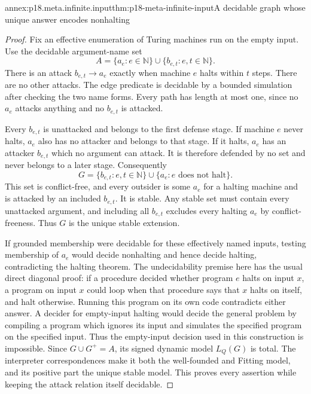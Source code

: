 \begin{annexitem}{annex:p18.meta.infinite.input}{thm:p18-meta-infinite-input}{A decidable graph whose unique answer encodes nonhalting}
\begin{proof}
Fix an effective enumeration of Turing machines
run on the empty input. Use the decidable
argument-name set
\[
           A=\{a_e:e\in\mathbb N\}
                       \cup\{b_{e,t}:e,t\in\mathbb N\}.
\]
There is an attack \(b_{e,t}\to a_e\) exactly
when machine \(e\) halts within \(t\) steps.
There are no other attacks. The edge predicate
is decidable by a bounded simulation after
checking the two name forms. Every path has
length at most one, since no \(a_e\) attacks
anything and no \(b_{e,t}\) is attacked.

Every \(b_{e,t}\) is unattacked and belongs
to the first defense stage.
If machine \(e\) never halts, \(a_e\) also
has no attacker and belongs to that stage.
If it halts, \(a_e\) has an attacker
\(b_{e,t}\) which no argument can attack.
It is therefore defended by no set and
never belongs to a later stage.
Consequently
\[
 G=\{b_{e,t}:e,t\in\mathbb N\}
                      \cup\{a_e:e\text{ does not halt}\}.
\]
This set is conflict-free, and every outsider
is some \(a_e\) for a halting machine and is
attacked by an included \(b_{e,t}\).
It is stable. Any stable set must contain
every unattacked argument, and including
all \(b_{e,t}\) excludes every halting
\(a_e\) by conflict-freeness. Thus \(G\)
is the unique stable extension.

If grounded membership were decidable for
these effectively named inputs, testing
membership of \(a_e\) would decide nonhalting
and hence decide halting, contradicting the
halting theorem. The undecidability premise here
has the usual direct diagonal proof: if a
procedure decided whether program \(e\) halts
on input \(x\), a program on input \(x\) could
loop when that procedure says that \(x\)
halts on itself, and halt otherwise.
Running this program on its own code
contradicts either answer. A decider for
empty-input halting would decide the
general problem by compiling a program
which ignores its input and simulates
the specified program on the specified
input. Thus the empty-input decision
used in this construction is impossible.
Since \(G\cup G^+=A\),
its signed dynamic model \(L_Q(G)\) is total.
The interpreter correspondences make it
both the well-founded and Fitting model,
and its positive part the unique stable
model. This proves every assertion while
keeping the attack relation itself decidable.
\end{proof}
\end{annexitem}

